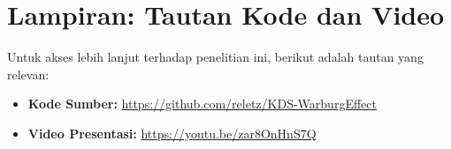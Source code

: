 \appendix
\section*{Lampiran: Tautan Kode dan Video}

Untuk akses lebih lanjut terhadap penelitian ini, berikut adalah tautan yang relevan:

\begin{itemize}
    \item \textbf{Kode Sumber:} \url{https://github.com/reletz/KDS-WarburgEffect}
    \item \textbf{Video Presentasi:} \url{https://youtu.be/zar8OnHnS7Q}
\end{itemize}
